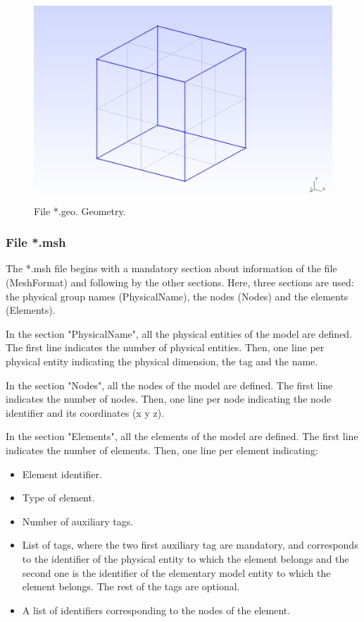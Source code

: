 \documentclass[a4]{article}
\begin{document}
\begin{figure}[h]
	\centering
	\includegraphics[scale = 0.3]{geometry.png}
	\caption{File *.geo. Geometry.}
	\label{fig:geometry}
\end{figure}

\subsubsection{File *.msh}
The *.msh file begins with a mandatory section about information of the file (MeshFormat) and following by the other sections. Here, three sections are used: the physical group names (PhysicalName), the nodes (Nodes) and the elements (Elements).

In the section "PhysicalName", all the physical entities of the model are defined. The first line
indicates the number of physical entities. Then, one line per physical entity indicating the physical dimension, the tag and the name.  
   
In the section "Nodes", all the nodes of the model are defined. The first line indicates the number of nodes. Then, one line per node indicating the node identifier and its coordinates (x y z).

In the section "Elements", all the elements of the model are defined. The first line indicates the number of elements. Then, one line per element indicating:

\begin{itemize}
	\item Element identifier.
	\item Type of element.
	\item Number of auxiliary tags.
	\item List of tags, where the two first auxiliary tag are mandatory, and corresponds to the identifier of the physical entity to which the element belongs and the second one is the identifier of the elementary model entity to which the element belongs. The rest of the tags are optional.
	\item A list of identifiers corresponding to the nodes of the element.
\end{itemize}
\end{document}
